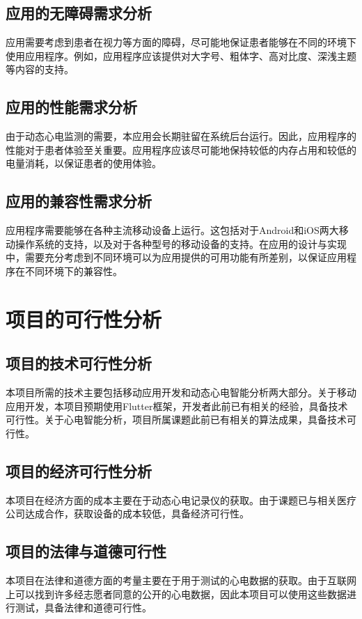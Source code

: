 \subsection{应用的无障碍需求分析}\label{subsec:accessibility}

应用需要考虑到患者在视力等方面的障碍，尽可能地保证患者能够在不同的环境下使用应用程序。例如，应用程序应该提供对大字号、粗体字、高对比度、深浅主题等内容的支持。

\subsection{应用的性能需求分析}\label{subsec:performance}

由于动态心电监测的需要，本应用会长期驻留在系统后台运行。因此，应用程序的性能对于患者体验至关重要。应用程序应该尽可能地保持较低的内存占用和较低的电量消耗，以保证患者的使用体验。

\subsection{应用的兼容性需求分析}\label{subsec:compatibility}

应用程序需要能够在各种主流移动设备上运行。这包括对于Android和iOS两大移动操作系统的支持，以及对于各种型号的移动设备的支持。在应用的设计与实现中，需要充分考虑到不同环境可以为应用提供的可用功能有所差别，以保证应用程序在不同环境下的兼容性。


\section{项目的可行性分析}\label{sec:feasibility}

\subsection{项目的技术可行性分析}\label{subsec:tech-feasibility}

本项目所需的技术主要包括移动应用开发和动态心电智能分析两大部分。关于移动应用开发，本项目预期使用Flutter框架，开发者此前已有相关的经验，具备技术可行性。关于心电智能分析，项目所属课题此前已有相关的算法成果\cite{songDongtaixindiantudezhinengjiancesuanfayanjiuyuyingyong2022}，具备技术可行性。

\subsection{项目的经济可行性分析}\label{subsec:economic-feasibility}

本项目在经济方面的成本主要在于动态心电记录仪的获取。由于课题已与相关医疗公司达成合作，获取设备的成本较低，具备经济可行性。

\subsection{项目的法律与道德可行性}\label{subsec:legal-feasibility}

本项目在法律和道德方面的考量主要在于用于测试的心电数据的获取。由于互联网上可以找到许多经志愿者同意的公开的心电数据，因此本项目可以使用这些数据进行测试，具备法律和道德可行性。
